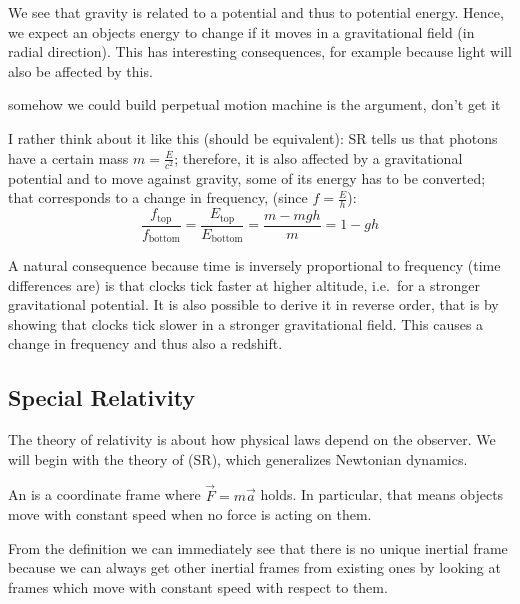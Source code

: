 We see that gravity is related to a potential and thus to potential energy. Hence, we expect an objects energy to change if it moves in a gravitational field (in radial direction). This has interesting consequences, for example because light will also be affected by this.

\begin{ex}
somehow we could build perpetual motion machine is the argument, don't get it

I rather think about it like this (should be equivalent): SR tells us that photons have a certain mass $m = \frac{E}{c^2}$; therefore, it is also affected by a gravitational potential and to move against gravity, some of its energy has to be converted; that corresponds to a change in frequency, (since $f = \frac{E}{h}$):
\begin{equation}
\frac{f_\text{top}}{f_\text{bottom}} = \frac{E_\text{top}}{E_\text{bottom}} = \frac{m - m g h}{m} = 1 - g h
\end{equation}
\end{ex}

A natural consequence because time is inversely proportional to frequency (time differences are) is that clocks tick faster at higher altitude, i.e.~for a stronger gravitational potential. It is also possible to derive it in reverse order, that is by showing that clocks tick slower in a stronger gravitational field. This causes a change in frequency and thus also a redshift.






	\subsection{Special Relativity}
The theory of relativity is about how physical laws depend on the observer. We will begin with the theory of  (SR), which generalizes Newtonian dynamics.

\begin{defi}
An  is a coordinate frame where $\vec{F} = m \vec{a}$ holds. In particular, that means objects move with constant speed when no force is acting on them.
\end{defi}
From the definition we can immediately see that there is no unique inertial frame because we can always get other inertial frames from existing ones by looking at frames which move with constant speed with respect to them.

